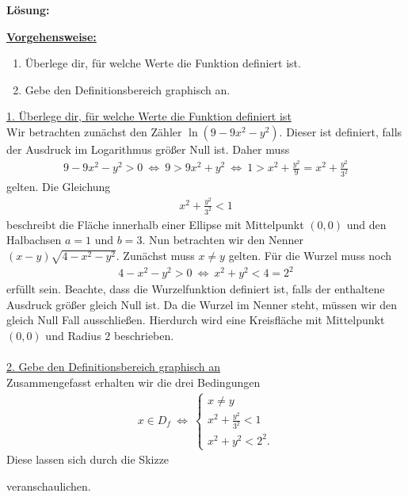 \textbf{Lösung:}
\begin{mdframed}
\underline{\textbf{Vorgehensweise:}}
\renewcommand{\labelenumi}{\theenumi.}
\begin{enumerate}
\item Überlege dir, für welche Werte die Funktion definiert ist.
\item Gebe den Definitionsbereich graphisch an.
\end{enumerate}
\end{mdframed}

\underline{1. Überlege dir, für welche Werte die Funktion definiert ist}\\
Wir betrachten zunächst den Zähler $ \ln(9 - 9 x^2 - y^2) $. 
Dieser ist definiert, falls der Ausdruck im Logarithmus größer Null ist. Daher muss
\begin{align*}
9 - 9x^2 -y^2  > 0 
\ 
\Leftrightarrow \
9 > 9x^2 + y^2
\
\Leftrightarrow
\
1 > x^2 + \frac{y^2}{9} = x^2 + \frac{y^2}{3^2}
\end{align*}
gelten. Die Gleichung
\begin{align*}
x^2  + \frac{y^2}{3^2} < 1
\end{align*}
beschreibt die Fläche innerhalb einer Ellipse mit Mittelpunkt $ (0,0) $ und den Halbachsen $ a = 1 $ und $ b = 3 $.
Nun betrachten wir den Nenner $ (x-y) \sqrt{4 - x^2 - y^2} $. Zunächst muss $ x \neq y $ gelten. 
Für die Wurzel muss noch
\begin{align*}
4 -x^2 - y^2 > 0
\
\Leftrightarrow
\
x^2 + y^2 < 4 = 2^2
\end{align*}
erfüllt sein.
Beachte, dass die Wurzelfunktion definiert ist, falls der enthaltene Ausdruck größer gleich Null ist.
Da die Wurzel im Nenner steht, müssen wir den gleich Null Fall ausschließen.
Hierdurch wird eine Kreisfläche mit Mittelpunkt $ (0,0) $ und Radius $ 2 $ beschrieben.
\\
\\
\underline{2. Gebe den Definitionsbereich graphisch an}\\
Zusammengefasst erhalten wir die drei Bedingungen
\begin{align*}
x \in D_f \
\Leftrightarrow
\
\begin{cases}
x \neq y\\
x^2  + \frac{y^2}{3^2} < 1\\
x^2 + y^2 <  2^2.
\end{cases}
\end{align*}
Diese lassen sich durch die Skizze
\begin{center}
\end{center}
veranschaulichen.


